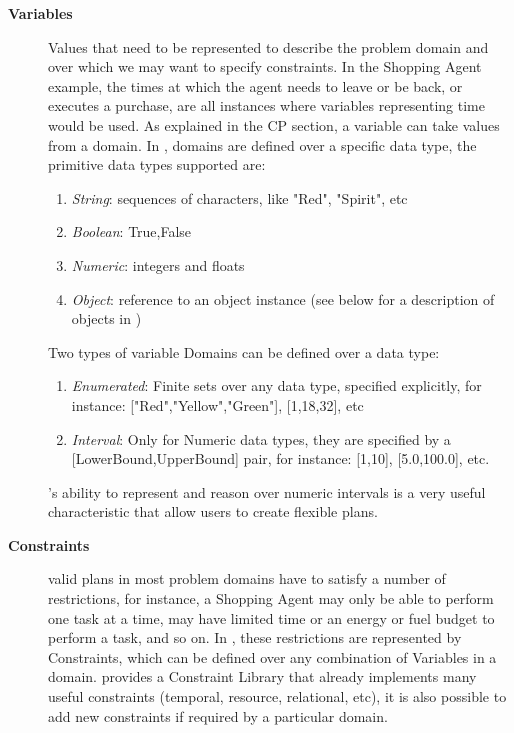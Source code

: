 \begin{description}

\item[\textbf{Variables}] Values that need to be represented to
  describe the problem domain and over which we may want to specify
  constraints. In the Shopping Agent example, the times at which the
  agent needs to leave or be back, or executes a purchase, are all
  instances where variables representing time would be used.  As
  explained in the \textsf{CP} section, a variable can take values
  from a domain. In \eu, domains are defined over a specific data
  type, the primitive data types supported are:

  \begin{enumerate}

  \item \textit{String}: sequences of characters, like "Red",
    "Spirit", etc

  \item \textit{Boolean}: {True,False}

  \item \textit{Numeric}: integers and floats

  \item \textit{Object}: reference to an object instance (see below
    for a description of objects in \eu)
  
\end {enumerate}

Two types of variable Domains can be defined over a data type:

  \begin{enumerate}

  \item \textit{Enumerated}: Finite sets over any data type, specified
    explicitly, for instance: ["Red","Yellow","Green"], [1,18,32], etc

  \item \textit{Interval}: Only for Numeric data types, they are
    specified by a [LowerBound,UpperBound] pair, for instance: [1,10],
    [5.0,100.0], etc.

  \end {enumerate}

  \eu's ability to represent and reason over numeric intervals is a
  very useful characteristic that allow users to create flexible
  plans.

\item[\textbf{Constraints}] valid plans in most problem domains have
  to satisfy a number of restrictions, for instance, a Shopping Agent
  may only be able to perform one task at a time, may have limited
  time or an energy or fuel budget to perform a task, and so on. In
  \eu, these restrictions are represented by Constraints, which can be
  defined over any combination of Variables in a domain. \eu provides
  a Constraint Library that already implements many useful constraints
  (temporal, resource, relational, etc), it is also possible to add
  new constraints if required by a particular domain.


\end{description}
